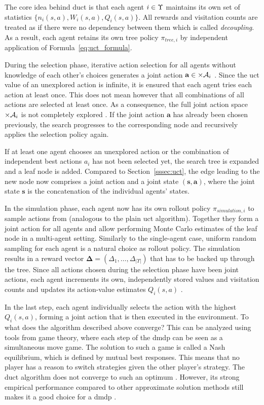 The core idea behind \gls{duct} is that each agent $i \in\agentset$ maintains its own set of statistics $\{n_i(s, a), W_i(s, a), Q_i(s, a) \}$. All rewards and visitation counts are treated as if there were no dependency between them which is called \emph{decoupling}. As a result, each agent retains its own tree policy $\pi_{tree, i}$ by independent application of Formula~\ref{eq:uct_formula}.

During the selection phase, iterative action selection for all agents without knowledge of each other's choices generates a joint action $\mathbf a \in \times \actionspace_i$ \cite{takMonteCarloTree2014}. Since the \gls{uct} value of an unexplored action is infinite, it is ensured that each agent tries each action at least once. This does not mean however that all combinations of all actions are selected at least once. As a consequence, the full joint action space $\times \actionspace_i$ is not completely explored \cite{takMonteCarloTree2014}. If the joint action $\mathbf a$ has already been chosen previously, the search progresses to the corresponding node and recursively applies the selection policy again.

If at least one agent chooses an unexplored action or the combination of independent best actions $a_i$ has not been selected yet, the search tree is expanded and a leaf node is added. Compared to Section~\ref{sssec:uct}, the edge leading to the new node now comprises a joint action and a joint state $(\mathbf s, \mathbf a)$, where the joint state $\mathbf s$ is the concatenation of the individual agents' states.

In the simulation phase, each agent now has its own rollout policy $\pi_{simulation, i}$ to sample actions from (analogous to the plain \gls{uct} algorithm). Together they form a joint action for all agents and allow performing Monte Carlo estimates of the leaf node in a multi-agent setting. Similarly to the single-agent case, uniform random sampling for each agent is a natural choice as rollout policy. The simulation  results in a reward vector $\pmb \Delta = (\Delta_1, \ldots, \Delta_{|\Upsilon|})$ that has to be backed up through the tree. Since all actions chosen during the selection phase have been joint actions, each agent increments its own, independently stored values and visitation counts and updates its action-value estimates $Q_i(s, a)$ \cite{takMonteCarloTree2014}.

In the last step, each agent individually selects the action with the highest $Q_i(s, a)$, forming a joint action that is then executed in the environment. To what does the algorithm described above converge? This can be analyzed using tools from game theory, where each step of the \gls{dmdp} can be seen as a simultaneous move game. The solution to such a game is called a Nash equilibrium, which is defined by mutual best responses. This means that no player has a reason to switch strategies given the other player's strategy. The \gls{duct} algorithm does not converge to such an optimum \cite{takMonteCarloTree2014}. However, its strong empirical performance compared to other approximate solution methods still makes it a good choice for a \gls{dmdp} \cite{takMonteCarloTree2014, lanctotMonteCarloTree}.

